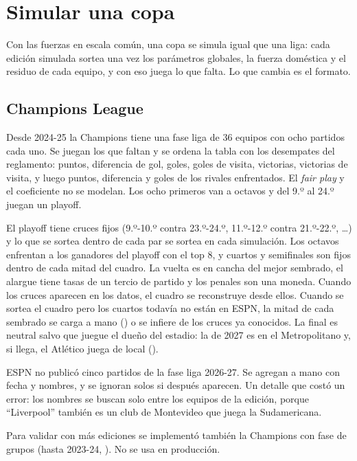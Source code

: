 \chapter{Simular una copa}
\label{cap:copas}

Con las fuerzas en escala común, una copa se simula igual que una liga: cada edición simulada sortea una vez los parámetros globales, la fuerza doméstica y el residuo de cada equipo, y con eso juega lo que falta. Lo que cambia es el formato.

\section{Champions League}

 Desde 2024-25 la Champions tiene una fase liga de 36 equipos con ocho partidos cada uno. Se juegan los que faltan y se ordena la tabla con los desempates del reglamento: puntos, diferencia de gol, goles, goles de visita, victorias, victorias de visita, y luego puntos, diferencia y goles de los rivales enfrentados. El \emph{fair play} y el coeficiente no se modelan. Los ocho primeros van a octavos y del 9.º al 24.º juegan un playoff.

 El playoff tiene cruces fijos (9.º-10.º contra 23.º-24.º, 11.º-12.º contra 21.º-22.º, \dots) y lo que se sortea dentro de cada par se sortea en cada simulación. Los octavos enfrentan a los ganadores del playoff con el top 8, y cuartos y semifinales son fijos dentro de cada mitad del cuadro. La vuelta es en cancha del mejor sembrado, el alargue tiene tasas de un tercio de partido y los penales son una moneda. Cuando los cruces aparecen en los datos, el cuadro se reconstruye desde ellos. Cuando se sortea el cuadro pero los cuartos todavía no están en ESPN, la mitad de cada sembrado se carga a mano () o se infiere de los cruces ya conocidos. La final es neutral salvo que juegue el dueño del estadio: la de 2027 es en el Metropolitano y, si llega, el Atlético juega de local ().

 ESPN no publicó cinco partidos de la fase liga 2026-27. Se agregan a mano con fecha y nombres, y se ignoran solos si después aparecen. Un detalle que costó un error: los nombres se buscan solo entre los equipos de la edición, porque ``Liverpool'' también es un club de Montevideo que juega la Sudamericana.

 Para validar con más ediciones se implementó también la Champions con fase de grupos (hasta 2023-24, ). No se usa en producción.

